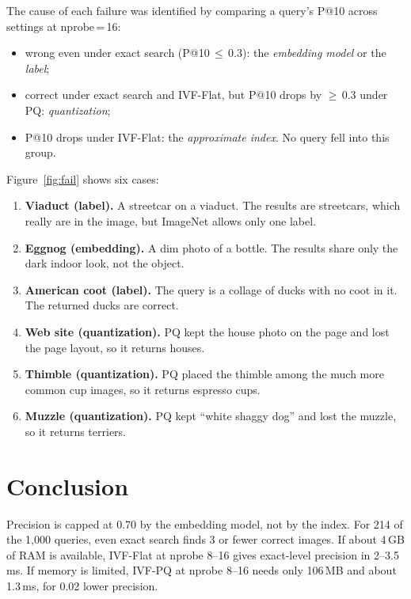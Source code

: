 \documentclass[sigconf,nonacm,pbalance]{acmart}
\begin{document}
The cause of each failure was identified by comparing a query's P@10 across settings at nprobe\,=\,16:
\begin{itemize}[nosep,leftmargin=*]
  \item wrong even under exact search (P@10\,$\le$\,0.3): the \emph{embedding model} or the \emph{label};
  \item correct under exact search and IVF-Flat, but P@10 drops by $\ge$\,0.3 under PQ: \emph{quantization};
  \item P@10 drops under IVF-Flat: the \emph{approximate index}. No query fell into this group.
\end{itemize}
Figure~\ref{fig:fail} shows six cases:
\begin{enumerate}[nosep,leftmargin=*]
  \item \textbf{Viaduct (label).} A streetcar on a viaduct. The results are streetcars, which really are in the image, but ImageNet allows only one label.
  \item \textbf{Eggnog (embedding).} A dim photo of a bottle. The results share only the dark indoor look, not the object.
  \item \textbf{American coot (label).} The query is a collage of ducks with no coot in it. The returned ducks are correct.
  \item \textbf{Web site (quantization).} PQ kept the house photo on the page and lost the page layout, so it returns houses.
  \item \textbf{Thimble (quantization).} PQ placed the thimble among the much more common cup images, so it returns espresso cups.
  \item \textbf{Muzzle (quantization).} PQ kept ``white shaggy dog'' and lost the muzzle, so it returns terriers.
\end{enumerate}

\section{Conclusion}

Precision is capped at 0.70 by the embedding model, not by the index. For 214 of the 1{,}000 queries, even exact search finds 3 or fewer correct images.
If about 4\,GB of RAM is available, IVF-Flat at nprobe 8--16 gives exact-level precision in 2--3.5\,ms. If memory is limited, IVF-PQ at nprobe 8--16 needs only
106\,MB and about 1.3\,ms, for 0.02 lower precision.
\end{document}
